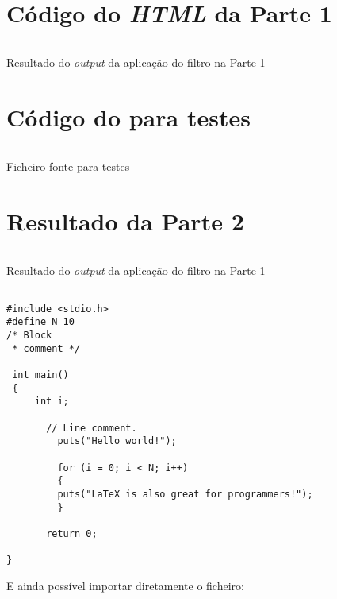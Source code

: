 \appendix

\chapter{Código do \emph{HTML} da Parte 1}
\label{appendix:a}

\begin{longlisting}
	\inputminted{html}{testes/res_html.html}
	\caption{Resultado do \emph{output} da aplicação do filtro na Parte 1}
	\label{listing:1}
\end{longlisting}


\chapter{Código do  para testes}
\label{appendix:a1}

\begin{longlisting}
	\inputminted{tex}{testes/ex3.bib}
	\caption{Ficheiro fonte  para testes}
	\label{listing:2}
\end{longlisting}


\chapter{Resultado da Parte 2}
\label{appendix:b}

\begin{longlisting}
	\inputminted{tex}{testes/resNorm.bib}
	\caption{Resultado do \emph{output} da aplicação do filtro na Parte 1}

	\label{listing:3}
\end{longlisting}



\begin{verbatim}

#include <stdio.h>
#define N 10
/* Block
 * comment */

 int main()
 {
     int i;
	 
	   // Line comment.
		 puts("Hello world!");
			     
		 for (i = 0; i < N; i++)
		 {
		 puts("LaTeX is also great for programmers!");
		 }
							 
	   return 0;
				
}
\end{verbatim}


E ainda possível importar diretamente o ficheiro:





